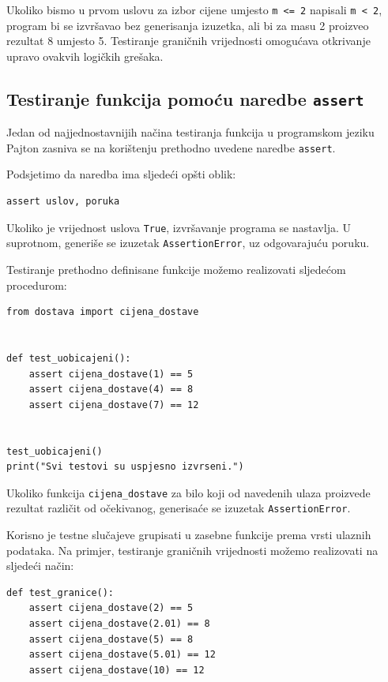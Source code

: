 Ukoliko bismo u prvom uslovu za izbor cijene umjesto 
\texttt{m <= 2} napisali \texttt{m < 2}, program bi se 
izvršavao bez generisanja izuzetka, ali bi za masu 2 
proizveo rezultat 8 umjesto 5. Testiranje graničnih 
vrijednosti omogućava otkrivanje upravo ovakvih 
logičkih grešaka.


\subsection{Testiranje funkcija pomoću naredbe \texttt{assert}}

Jedan od najjednostavnijih načina testiranja funkcija 
u programskom jeziku Pajton zasniva se na korištenju 
prethodno uvedene naredbe \texttt{assert}.

Podsjetimo da naredba ima sljedeći opšti oblik:

\begin{verbatim}
assert uslov, poruka
\end{verbatim}

Ukoliko je vrijednost uslova \texttt{True}, izvršavanje 
programa se nastavlja. U suprotnom, generiše se izuzetak 
\texttt{AssertionError}, uz odgovarajuću poruku.

Testiranje prethodno definisane funkcije možemo 
realizovati sljedećom procedurom:

\begin{verbatim}
from dostava import cijena_dostave


def test_uobicajeni():
    assert cijena_dostave(1) == 5
    assert cijena_dostave(4) == 8
    assert cijena_dostave(7) == 12


test_uobicajeni()
print("Svi testovi su uspjesno izvrseni.")
\end{verbatim}

Ukoliko funkcija \texttt{cijena\_dostave} za bilo koji 
od navedenih ulaza proizvede rezultat različit od 
očekivanog, generisaće se izuzetak 
\texttt{AssertionError}.

Korisno je testne slučajeve grupisati u zasebne 
funkcije prema vrsti ulaznih podataka. Na primjer, 
testiranje graničnih vrijednosti možemo realizovati 
na sljedeći način:

\begin{verbatim}
def test_granice():
    assert cijena_dostave(2) == 5
    assert cijena_dostave(2.01) == 8
    assert cijena_dostave(5) == 8
    assert cijena_dostave(5.01) == 12
    assert cijena_dostave(10) == 12
\end{verbatim}

